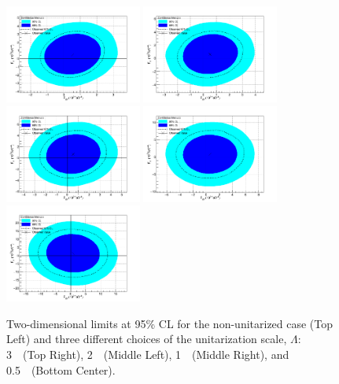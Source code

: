 \begin{figure}[htp]
\centering
\includegraphics[width=0.4\textwidth]{figures/aQGC/lll-Un-Unit.png}
\includegraphics[width=0.4\textwidth]{figures/aQGC/lll-3000.png}
\includegraphics[width=0.4\textwidth]{figures/aQGC/lll-2000.png}
\includegraphics[width=0.4\textwidth]{figures/aQGC/lll-1000.png}
\includegraphics[width=0.4\textwidth]{figures/aQGC/lll-500.png}
\caption{Two-dimensional limits at 95\% CL for the non-unitarized case (Top Left)
and three different choices of the unitarization scale, $\Lambda$:
3~\TeV~(Top Right), 2~\TeV~(Middle Left), 1~\TeV~(Middle Right), and 0.5~\TeV~(Bottom Center).}
\label{fig:WWW2D}
\end{figure}  


  

  

  
